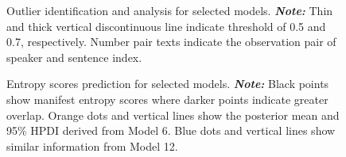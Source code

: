 \documentclass[
  authoryear,
  preprint,
  1p]{elsarticle}
\begin{document}
\label{cell-fig-rq1-model-outliers}
\begin{figure}[H]


\caption{\label{fig-rq1-model-outliers}Outlier identification and
analysis for selected models. \textbf{\emph{Note:}} Thin and thick
vertical discontinuous line indicate threshold of 0.5 and 0.7,
respectively. Number pair texts indicate the observation pair of speaker
and sentence index.}

\end{figure}%

\label{cell-fig-rq3-pred-speaker}
\begin{figure}[H]


\caption{\label{fig-rq3-pred-speaker}Entropy scores prediction for
selected models. {\textbf{\emph{Note:}} Black points show manifest
entropy scores where darker points indicate greater overlap. Orange dots
and vertical lines show the posterior mean and 95\% HPDI derived from
Model 6. Blue dots and vertical lines show similar information from
Model 12.}}

\end{figure}%
\end{document}
